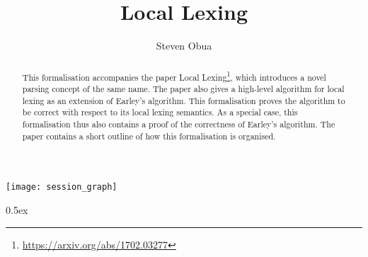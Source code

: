 \documentclass[11pt,a4paper]{article}
\begin{document}
\title{Local Lexing}
\author{Steven Obua}
\maketitle

\begin{abstract}
This formalisation accompanies the paper Local Lexing\footnote{\url{https://arxiv.org/abs/1702.03277}}, which introduces a novel parsing concept of the same name. The paper also gives a high-level algorithm for local lexing as an extension of Earley's algorithm. This formalisation proves the algorithm to be correct with respect to its local lexing semantics. As a special case, this formalisation thus also contains a proof of the correctness of Earley's algorithm. The paper contains a short outline of how this formalisation is organised.
\end{abstract}

\tableofcontents

\begin{center}
  \texttt{[image: session\_graph]}
\end{center}

\clearpage

\parindent 0pt\parskip 0.5ex

\end{document}
